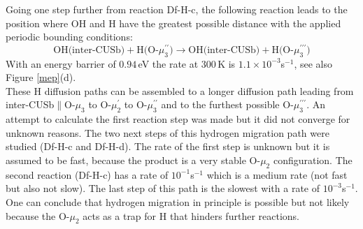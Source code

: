 \documentclass[11pt,DIV=13,BCOR=5mm,a4paper,headinclude]{scrbook}
\begin{document}
Going one step further from reaction Df-H-c, the following reaction leads to the position where OH and H have the greatest possible distance with the applied periodic bounding conditions:
\begin{equation}
 \text{OH(inter-CUSb)} + \text{H(O-$\mu_3^{\prime\prime}$)} \rightarrow \text{OH(inter-CUSb)} + \text{H(O-$\mu_3^{\prime\prime\prime}$)} \tag{Df-H-d}
     \label{diffHd}
\end{equation}
With an energy barrier of $0.94\,$eV the rate at $300\,$K is $1.1\times 10^{-3}$s$^{-1}$, see also Figure \ref{mep}(d).
\\
These H diffusion paths can be assembled to a longer diffusion path leading from inter-CUSb$\parallel$O-$\mu_3$ to O-$\mu_2^\prime$ to O-$\mu_3^{\prime\prime}$ and to the furthest possible O-$\mu_3^{\prime\prime\prime}$.
An attempt to calculate the first reaction step was made but it did not converge for unknown reasons.
The two next steps of this hydrogen migration path were studied (Df-H-c and Df-H-d).
The rate of the first step is unknown but it is assumed to be fast, because the product is a very stable O-$\mu_2$ configuration.
The second reaction (Df-H-c) has a rate of $10^{-1}$s$^{-1}$ which is a medium rate (not fast but also not slow).
The last step of this path is the slowest with a rate of $10^{-3}$s$^{-1}$.
One can conclude that hydrogen migration in principle is possible but not likely because the O-$\mu_2$ acts as a trap for H that hinders further reactions.
\\
\end{document}
